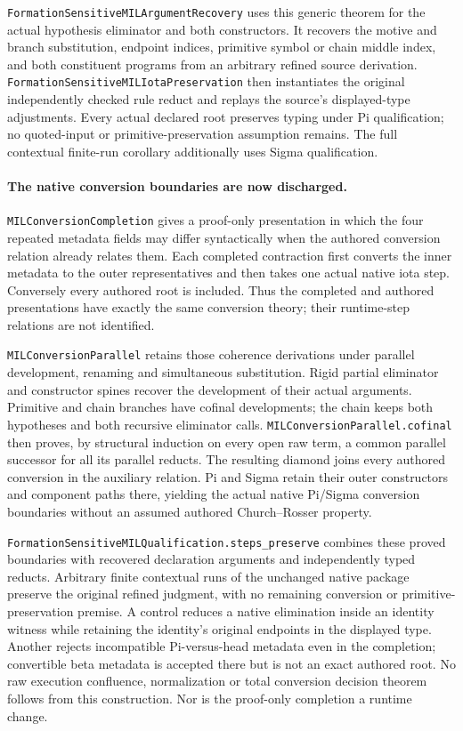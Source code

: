 \documentclass[11pt]{article}
\theoremstyle{definition}
\theoremstyle{remark}
\begin{document}
\nolinkurl{FormationSensitiveMILArgumentRecovery} uses this generic theorem
for the actual hypothesis eliminator and both constructors. It recovers
the motive and branch substitution, endpoint indices, primitive symbol or
chain middle index, and both constituent programs from an arbitrary refined
source derivation. \nolinkurl{FormationSensitiveMILIotaPreservation} then
instantiates the original independently checked rule reduct and replays the
source's displayed-type adjustments. Every actual declared root preserves
typing under Pi qualification; no quoted-input or primitive-preservation
assumption remains. The full contextual finite-run corollary additionally
uses Sigma qualification.

\paragraph{The native conversion boundaries are now discharged.}
\nolinkurl{MILConversionCompletion} gives a proof-only presentation in which
the four repeated metadata fields may differ syntactically when the authored
conversion relation already relates them. Each completed contraction first
converts the inner metadata to the outer representatives and then takes one
actual native iota step. Conversely every authored root is included. Thus
the completed and authored presentations have exactly the same conversion
theory; their runtime-step relations are not identified.

\nolinkurl{MILConversionParallel} retains those coherence derivations under
parallel development, renaming and simultaneous substitution. Rigid partial
eliminator and constructor spines recover the development of their actual
arguments. Primitive and chain branches have cofinal developments; the chain
keeps both hypotheses and both recursive eliminator calls.
\nolinkurl{MILConversionParallel.cofinal} then proves, by structural
induction on every open raw term, a common parallel successor for all its
parallel reducts. The resulting diamond joins every authored conversion in
the auxiliary relation. Pi and Sigma retain their outer constructors and
component paths there, yielding the actual native Pi/Sigma conversion
boundaries without an assumed authored Church--Rosser property.

\nolinkurl{FormationSensitiveMILQualification.steps_preserve} combines these
proved boundaries with recovered declaration arguments and independently
typed reducts. Arbitrary finite contextual runs of the unchanged native
package preserve the original refined judgment, with no remaining
conversion or primitive-preservation premise. A control reduces a native
elimination inside an identity witness while retaining the identity's
original endpoints in the displayed type. Another rejects incompatible
Pi-versus-head metadata even in the completion; convertible beta metadata
is accepted there but is not an exact authored root. No raw execution
confluence, normalization or total conversion decision theorem follows from
this construction. Nor is the proof-only completion a runtime change.
\end{document}
